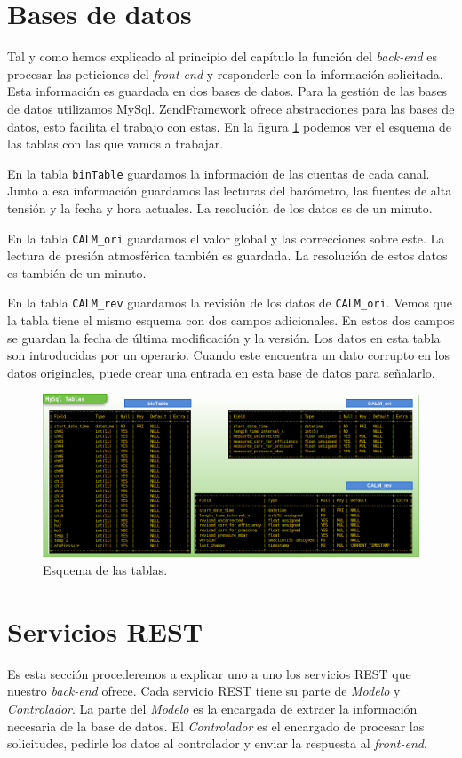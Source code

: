 \section{Bases de datos}
	Tal y como hemos explicado al principio del capítulo la función del \emph{back-end} es  procesar las peticiones del \emph{front-end} y
	responderle con la información solicitada. Esta información es guardada en dos bases de datos. Para la gestión de las bases de datos
	utilizamos MySql\cite{MySql}. ZendFramework ofrece abstracciones para las bases de datos, esto facilita el trabajo con estas. En la
	figura \ref{fig:tablas} podemos ver el esquema de las tablas con las que vamos a trabajar.
	\par
	En la tabla \texttt{binTable} guardamos la información de las cuentas de cada canal. Junto a esa información guardamos las lecturas del
	barómetro, las fuentes de alta tensión y la fecha y hora actuales. La resolución de los datos es de un minuto.
	\par
	En la tabla \texttt{CALM\_ori} guardamos el valor global y  las correcciones sobre este. La lectura de presión atmosférica también es guardada.
	La resolución de estos datos es también de un minuto.
	\par
	En la tabla \texttt{CALM\_rev} guardamos la revisión de los datos de \texttt{CALM\_ori}. Vemos que la tabla tiene el mismo esquema con dos
	campos adicionales. En estos dos campos se guardan la fecha de última modificación y la versión. Los datos en esta tabla son introducidas por
	un operario. Cuando este encuentra un dato corrupto en los datos originales, puede crear una entrada en esta base de datos para señalarlo.
	\begin{figure}[h]
		\centering
		\includegraphics[keepaspectratio, width=1\textwidth]{./img/tablas.png}
		\caption{Esquema de las tablas.}
		\label{fig:tablas}
	\end{figure}
\section{Servicios REST}
  	Es esta sección procederemos a explicar uno a uno los servicios REST que nuestro \emph{back-end} ofrece. Cada servicio REST tiene su parte de
	\emph{Modelo} y \emph{Controlador}. La parte del \emph{Modelo} es la encargada de extraer la información necesaria de la base de datos. El
	\emph{Controlador} es el encargado de procesar las solicitudes, pedirle los datos al controlador y enviar la respuesta al \emph{front-end}.

